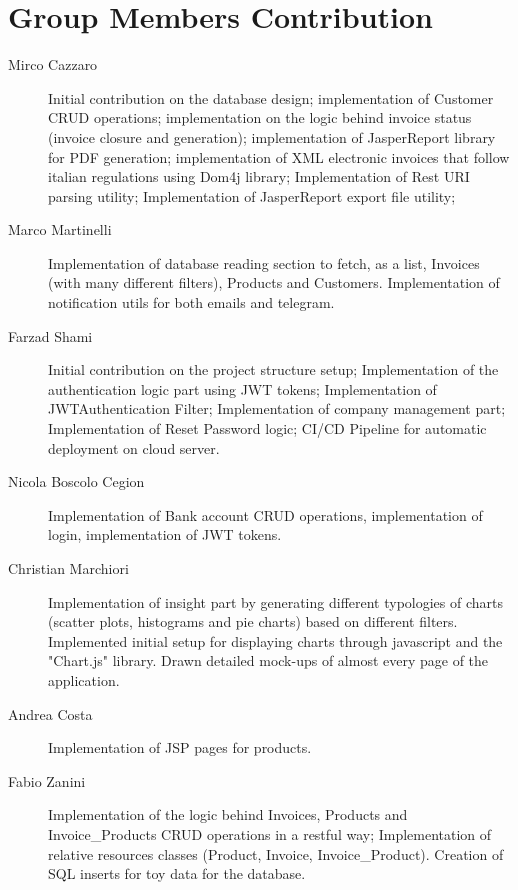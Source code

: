 \section{Group Members Contribution}


\begin{description}
	\item[Mirco Cazzaro] Initial contribution on the database design; implementation of Customer CRUD operations; implementation on the logic behind invoice status (invoice closure and generation); implementation of JasperReport library for PDF generation; implementation of XML electronic invoices that follow italian regulations using Dom4j library; Implementation of Rest URI parsing utility; Implementation of JasperReport export file utility;
	\item[Marco Martinelli] Implementation of database reading section to fetch, as a list, Invoices (with many different filters), Products and Customers. Implementation of notification utils for both emails and telegram. 
	\item[Farzad Shami] Initial contribution on the project structure setup; Implementation of the authentication logic part using JWT tokens; Implementation of JWTAuthentication Filter; Implementation of company management part; Implementation of Reset Password logic; CI/CD Pipeline for automatic deployment on cloud server.
	\item[Nicola Boscolo Cegion] Implementation of Bank account CRUD operations, implementation of login, implementation of JWT tokens.
	\item[Christian Marchiori] Implementation of insight part by generating different typologies of charts (scatter plots, histograms and pie charts) based on different filters. Implemented initial setup for displaying charts through javascript and the "Chart.js" library. Drawn detailed mock-ups of almost every page of the application.
	\item[Andrea Costa] Implementation of JSP pages for products.
	\item[Fabio Zanini] Implementation of the logic behind Invoices, Products and Invoice\_Products CRUD operations in a restful way; Implementation of relative resources classes (Product, Invoice, Invoice\_Product). Creation of SQL inserts for toy data for the database.
\end{description}
